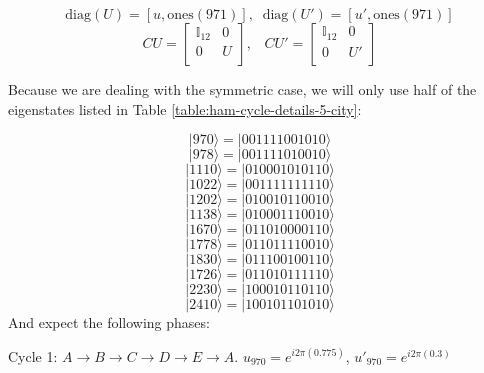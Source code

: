 \documentclass[msc,oneside]{ubcthesis}
\begin{document}
	\begin{equation}\label{ones}
	\mathrm{diag}(U) = [u, \mathrm{ones}(971)], \;\; \mathrm{diag}(U') = [u', \mathrm{ones}(971)]
	\end{equation}
\begin{equation*}
	CU = \begin{bmatrix}
		\mathbb{I}_{12} & 0 \\
		0 & U \\
	\end{bmatrix},\;\;\;
	CU' = \begin{bmatrix}
		\mathbb{I}_{12} & 0 \\
		0 & U' \\
	\end{bmatrix}
\end{equation*}	
	
	Because we are dealing with the symmetric case, we will only use half of the eigenstates listed in Table \ref{table:ham-cycle-details-5-city}:
	
	$$|970\rangle  = |001111001010\rangle$$
	$$|978\rangle  = |001111010010\rangle$$
	$$|1110\rangle = |010001010110\rangle$$
	$$|1022\rangle = |001111111110\rangle$$
	$$|1202\rangle = |010010110010\rangle$$
	$$|1138\rangle = |010001110010\rangle$$
	$$|1670\rangle = |011010000110\rangle$$
	$$|1778\rangle = |011011110010\rangle$$
	$$|1830\rangle = |011100100110\rangle$$
	$$|1726\rangle = |011010111110\rangle$$
	$$|2230\rangle = |100010110110\rangle$$
	$$|2410\rangle = |100101101010\rangle$$
	And expect the following phases:
	
		Cycle 1: $A \rightarrow B \rightarrow C \rightarrow D \rightarrow E \rightarrow A$.\;\;\;\;\;\;\;\;\;\;\;\;\;\; $u_{970}  = e^{i2\pi(0.775)}$, \;\;\;\;\;$u'_{970} = e^{i2\pi(0.3)}$
		
\end{document}
